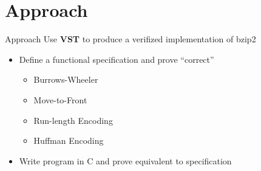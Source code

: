 \documentclass{beamer}
\begin{document}
  \section{Approach}
  \begin{frame}{Approach}
    Use \textbf{VST} to produce a verifized implementation of bzip2
    \begin{itemize}
    \item Define a functional specification and prove ``correct''
      \begin{itemize}
      \item \alert{Burrows-Wheeler}
      \item Move-to-Front
      \item Run-length Encoding
      \item Huffman Encoding
      \end{itemize}
    \item Write program in C and prove equivalent to specification
    \end{itemize}

  \end{frame}
\end{document}

